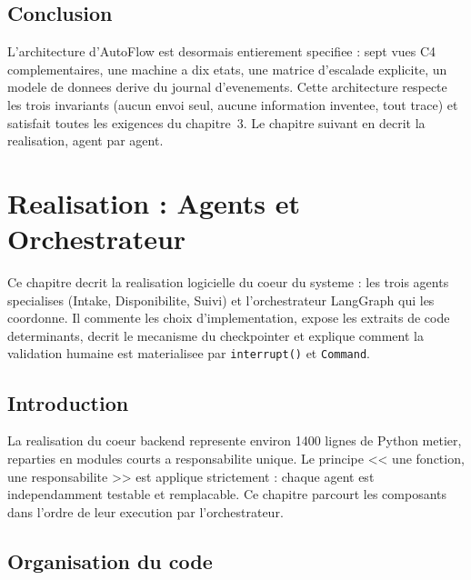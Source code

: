 \documentclass[12pt,a4paper,openany]{report}
\begin{document}
\section{Conclusion}

L'architecture d'AutoFlow est desormais entierement specifiee : sept vues C4 complementaires, une machine a dix etats, une matrice d'escalade explicite, un modele de donnees derive du journal d'evenements. Cette architecture respecte les trois invariants (aucun envoi seul, aucune information inventee, tout trace) et satisfait toutes les exigences du chapitre~3. Le chapitre suivant en decrit la realisation, agent par agent.

\chapter{Realisation : Agents et Orchestrateur}\label{chap:realisation1}
Ce chapitre decrit la realisation logicielle du coeur du systeme : les trois agents specialises (Intake, Disponibilite, Suivi) et l'orchestrateur LangGraph qui les coordonne. Il commente les choix d'implementation, expose les extraits de code determinants, decrit le mecanisme du checkpointer et explique comment la validation humaine est materialisee par \texttt{interrupt()} et \texttt{Command}.

\section{Introduction}
La realisation du coeur backend represente environ 1400 lignes de Python metier, reparties en modules courts a responsabilite unique. Le principe << une fonction, une responsabilite >> est applique strictement : chaque agent est independamment testable et remplacable. Ce chapitre parcourt les composants dans l'ordre de leur execution par l'orchestrateur.

\section{Organisation du code}
\end{document}
